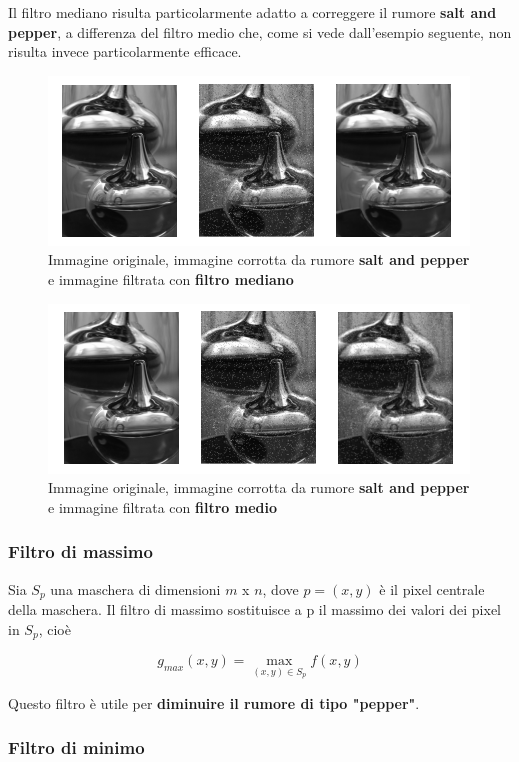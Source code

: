 Il filtro mediano risulta particolarmente adatto a correggere il rumore \textbf{salt and pepper}, a differenza del filtro medio che, come si
vede dall'esempio seguente, non risulta invece particolarmente efficace.

\begin{figure}[H]
    \centering
    \includegraphics[keepaspectratio]{capitoli/immagini/imgs/esempio-filtro-mediano.png}
    \caption{Immagine originale, immagine corrotta da rumore \textbf{salt and pepper} e immagine filtrata con \textbf{filtro mediano}}
\end{figure}
\begin{figure}[H]
    \centering
    \includegraphics[keepaspectratio]{capitoli/immagini/imgs/esempio-filtro-medio.png}
    \caption{Immagine originale, immagine corrotta da rumore \textbf{salt and pepper} e immagine filtrata con \textbf{filtro medio}}
\end{figure}

\subsubsection{Filtro di massimo}

Sia $S_p$ una maschera di dimensioni $m $ x $n$, dove $p = (x,y)$ è il pixel centrale della maschera.
Il filtro di massimo sostituisce a p il massimo dei valori dei pixel in $S_p$, cioè

$$
    g_{max}(x,y)= \max_{(x,y) \in S_p} f(x,y)
$$

Questo filtro è utile per \textbf{diminuire il rumore di tipo "pepper"}.

\subsubsection{Filtro di minimo}

